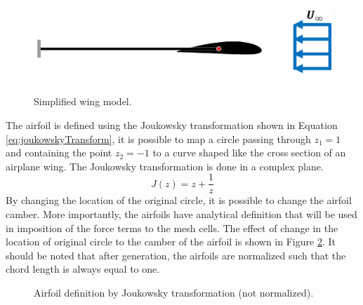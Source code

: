 \documentclass[12pt]{aiaa-pretty}
\begin{document}
%
\begin{figure}
	\centering
	\includegraphics[height=3.75cm]{figure/airfoil/airfoil.png}
	\caption{Simplified wing model.}
	\label{fig:wingModel}
\end{figure}
%

The airfoil is defined using the Joukowsky transformation shown in Equation \eqref{eq:joukowskyTransform}, it is possible to map a circle passing through $z_1 = 1$ and containing the point $z_2 = -1$ to a curve shaped like the cross section of an airplane wing. The Joukowsky transformation is done in a complex plane.
%
\begin{equation}\label{eq:joukowskyTransform}
J(z) = z + \frac{1}{z}
\end{equation}
%
By changing the location of the original circle, it is possible to change the airfoil camber. More importantly, the airfoils have analytical definition that will be used in imposition of the force terms to the mesh cells. The effect of change in the location of original circle to the camber of the airfoil is shown in Figure \ref{fig:joukowskiChamber}. It should be noted that after generation, the airfoils are normalized such that the chord length is always equal to one.\\

%
	\begin{figure}[H]
		\centering
		\quad
		\caption{Airfoil definition by Joukowsky transformation (not normalized).}
		\label{fig:joukowskiChamber}
	\end{figure}
%
\end{document}
